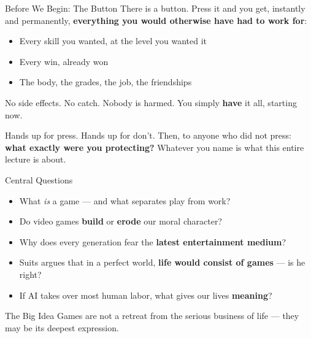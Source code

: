 \documentclass[aspectratio=169,11pt]{beamer}
\begin{document}
\begin{frame}{Before We Begin: The Button}
There is a button. Press it and you get, instantly and permanently, \textbf{everything you would otherwise have had to work for}:

\begin{itemize}
    \item Every skill you wanted, at the level you wanted it
    \item Every win, already won
    \item The body, the grades, the job, the friendships
\end{itemize}

No side effects. No catch. Nobody is harmed. You simply \textbf{have} it all, starting now.

\begin{discussionbox}
Hands up for press. Hands up for don't. Then, to anyone who did not press: \textbf{what exactly were you protecting?} Whatever you name is what this entire lecture is about.
\end{discussionbox}
\end{frame}

\begin{frame}{Central Questions}
\begin{itemize}
    \item What \emph{is} a game --- and what separates play from work?
    \item Do video games \textbf{build} or \textbf{erode} our moral character?
    \item Why does every generation fear the \textbf{latest entertainment medium}?
    \item Suits argues that in a perfect world, \textbf{life would consist of games} --- is he right?
    \item If AI takes over most human labor, what gives our lives \textbf{meaning}?
\end{itemize}

\vspace{0.2cm}
\begin{alertblock}{The Big Idea}
Games are not a retreat from the serious business of life --- they may be its deepest expression.
\end{alertblock}
\end{frame}
\end{document}
